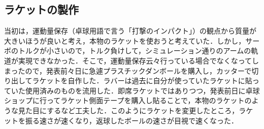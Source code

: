 \documentclass[10pt, oneside, titlepage]{ltjarticle}  %
\begin{document}
  \subsection{ラケットの製作}
  当初は，運動量保存（卓球用語で言う「打撃のインパクト」）の観点から質量が大きいほうが良いと考え，本物のラケットを使おうと考えていた．しかし，サーボのトルクが小さいので，トルク負けして，シミュレーション通りのアームの軌道が実現できなかった．そこで，運動量保存云々行っている場合でなくなってしまったので，発表前々日に急遽プラスチックダンボールを購入し，カッターで切り出してラケットを自作した．ラバーは過去に自分が使っていたラケットに貼っていた使用済みのものを流用した．即席ラケットではありつつ，発表前日に卓球ショップに行ってラケット側面テープを購入し貼ることで，本物のラケットのような見た目にするなど工夫した．このようにラケットを変更したところ，ラケットを振る速さが速くなり，返球したボールの速さが目視で速くなった．
\end{document}
